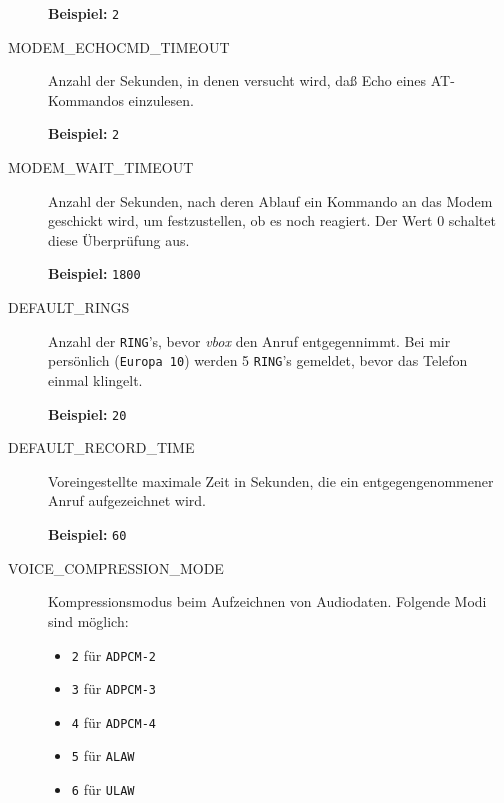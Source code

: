 \begin{description}
{\bf Beispiel:} {\tt 2}



\item[MODEM\_ECHOCMD\_TIMEOUT] \mbox{}



Anzahl der Sekunden, in denen versucht wird, da{\ss} Echo eines AT-Kommandos
einzulesen.

{\bf Beispiel:} {\tt 2}



\item[MODEM\_WAIT\_TIMEOUT] \mbox{}



Anzahl der Sekunden, nach deren Ablauf ein Kommando an das Modem geschickt
wird, um festzustellen, ob es noch reagiert. Der Wert 0 schaltet diese
\"{U}berpr\"{u}fung aus.

{\bf Beispiel:} {\tt 1800}



\item[DEFAULT\_RINGS] \mbox{}



Anzahl der {\tt RING}'s, bevor {\em vbox\/} den Anruf entgegennimmt.
Bei mir pers\"{o}nlich ({\tt Europa 10}) werden 5 {\tt RING}'s
gemeldet, bevor das Telefon einmal klingelt.

{\bf Beispiel:} {\tt 20}



\item[DEFAULT\_RECORD\_TIME] \mbox{}



Voreingestellte maximale Zeit in Sekunden, die ein entgegengenommener
Anruf aufgezeichnet wird.

{\bf Beispiel:} {\tt 60}



\item[VOICE\_COMPRESSION\_MODE] \mbox{}



Kompressionsmodus beim Aufzeichnen von Audiodaten. Folgende Modi sind
m\"{o}glich:

\begin{itemize}
\item {\tt 2} f\"{u}r {\tt ADPCM-2}
\item {\tt 3} f\"{u}r {\tt ADPCM-3}
\item {\tt 4} f\"{u}r {\tt ADPCM-4}
\item {\tt 5} f\"{u}r {\tt ALAW}
\item {\tt 6} f\"{u}r {\tt ULAW}
\end{itemize}



\end{description}
